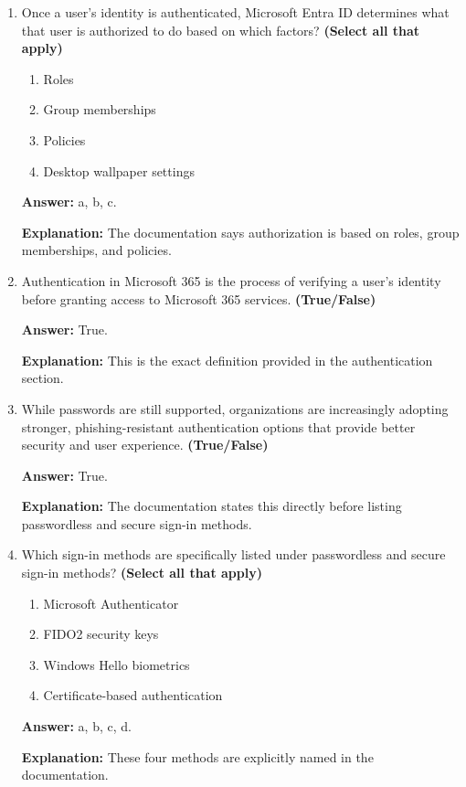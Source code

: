 \documentclass[10pt]{article}
\begin{document}
\begin{enumerate}[leftmargin=*]
\textbf{Explanation:} These are the tools named in the hybrid identity section.

\item Once a user’s identity is authenticated, Microsoft Entra ID determines what that user is authorized to do based on which factors? \textbf{(Select all that apply)}
\begin{enumerate}[label=\alph*., leftmargin=1.5em]
\item Roles
\item Group memberships
\item Policies
\item Desktop wallpaper settings
\end{enumerate}
\textbf{Answer:} a, b, c.

\textbf{Explanation:} The documentation says authorization is based on roles, group memberships, and policies.

\item Authentication in Microsoft 365 is the process of verifying a user’s identity before granting access to Microsoft 365 services. \textbf{(True/False)}

\textbf{Answer:} True.

\textbf{Explanation:} This is the exact definition provided in the authentication section.

\item While passwords are still supported, organizations are increasingly adopting stronger, phishing-resistant authentication options that provide better security and user experience. \textbf{(True/False)}

\textbf{Answer:} True.

\textbf{Explanation:} The documentation states this directly before listing passwordless and secure sign-in methods.

\item Which sign-in methods are specifically listed under passwordless and secure sign-in methods? \textbf{(Select all that apply)}
\begin{enumerate}[label=\alph*., leftmargin=1.5em]
\item Microsoft Authenticator
\item FIDO2 security keys
\item Windows Hello biometrics
\item Certificate-based authentication
\end{enumerate}
\textbf{Answer:} a, b, c, d.

\textbf{Explanation:} These four methods are explicitly named in the documentation.


\end{enumerate}
\end{document}
